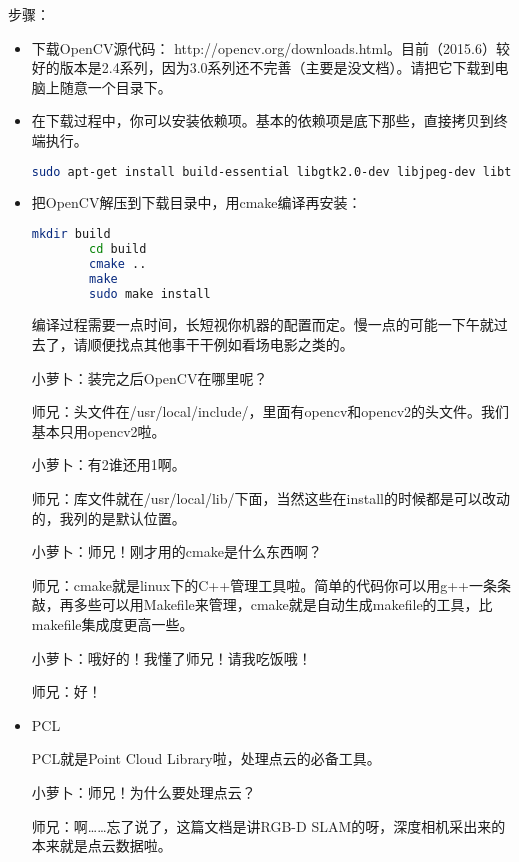 \documentclass[9pt,a4paper]{article}
\begin{document}
步骤：
\begin{itemize}
	\item 下载OpenCV源代码： http://opencv.org/downloads.html。目前（2015.6）较好的版本是2.4系列，因为3.0系列还不完善（主要是没文档）。请把它下载到电脑上随意一个目录下。
	\item 在下载过程中，你可以安装依赖项。基本的依赖项是底下那些，直接拷贝到终端执行。
	\begin{lstlisting}[language=sh]
		sudo apt-get install build-essential libgtk2.0-dev libjpeg-dev libtiff4-dev libjasper-dev libopenexr-dev cmake python-dev python-numpy python-tk libtbb-dev libeigen2-dev yasm libfaac-dev libopencore-amrnb-dev libopencore-amrwb-dev libtheora-dev libvorbis-dev libxvidcore-dev libx264-dev libqt4-dev libqt4-opengl-dev sphinx-common texlive-latex-extra libv4l-dev libdc1394-22-dev libavcodec-dev libavformat-dev libswscale-dev
	\end{lstlisting}
	
	\item 把OpenCV解压到下载目录中，用cmake编译再安装：
	\begin{lstlisting}[language=sh]
		mkdir build
		cd build
		cmake ..
		make
		sudo make install
	\end{lstlisting}
	
	编译过程需要一点时间，长短视你机器的配置而定。慢一点的可能一下午就过去了，请顺便找点其他事干干例如看场电影之类的。
	
	小萝卜：装完之后OpenCV在哪里呢？
	
	师兄：头文件在/usr/local/include/，里面有opencv和opencv2的头文件。我们基本只用opencv2啦。
	
	小萝卜：有2谁还用1啊。
	
	师兄：库文件就在/usr/local/lib/下面，当然这些在install的时候都是可以改动的，我列的是默认位置。
	
	小萝卜：师兄！刚才用的cmake是什么东西啊？
	
	师兄：cmake就是linux下的C++管理工具啦。简单的代码你可以用g++一条条敲，再多些可以用Makefile来管理，cmake就是自动生成makefile的工具，比makefile集成度更高一些。
	
	小萝卜：哦好的！我懂了师兄！请我吃饭哦！
	
	师兄：好！
	
	\item PCL
	
	PCL就是Point Cloud Library啦，处理点云的必备工具。
	
	小萝卜：师兄！为什么要处理点云？
	
	师兄：啊……忘了说了，这篇文档是讲RGB-D SLAM的呀，深度相机采出来的本来就是点云数据啦。
	

\end{itemize}
\end{document}
